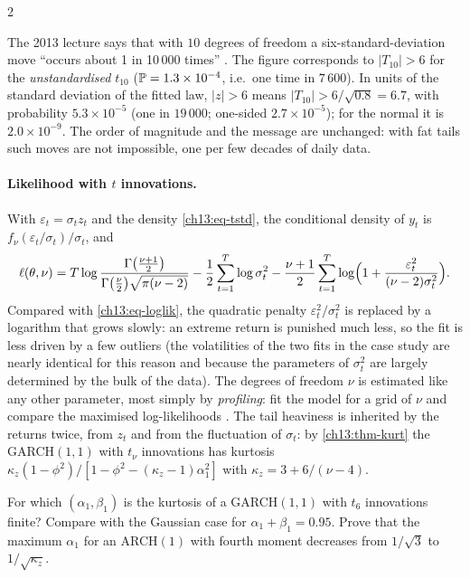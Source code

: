 \begin{paracol}{2}
\begin{coursenote}\label{ch13:cn-6sd}
The 2013 lecture says that with $10$ degrees of freedom a six-standard-deviation move ``occurs about 1 in 10\,000 times'' . The figure corresponds to $|T_{10}|>6$ for the \emph{unstandardised} $t_{10}$ ($\mathbb{P}=1.3\times10^{-4}$, i.e.\ one
time in $7\,600$). In units of the standard deviation of the fitted law, $|z|>6$ means $|T_{10}|>6/\sqrt{0.8}=6.7$, with probability $5.3\times10^{-5}$ (one in $19\,000$; one-sided $2.7\times10^{-5}$); for the normal it is $2.0\times10^{-9}$. The order of magnitude and the message are unchanged: with fat tails such moves are not
impossible, one per few decades of daily data.
\end{coursenote}

\paragraph{Likelihood with $t$ innovations.} With $\varepsilon_t=\sigma_tz_t$ and the density \eqref{ch13:eq-tstd}, the conditional density of $y_t$ is $f_\nu(\varepsilon_t/\sigma_t)/\sigma_t$, and
\begin{equation}\label{ch13:eq-loglikt}
  \ell(\theta,\nu)=T\log\frac{\Gamma\bigl(\frac{\nu+1}2\bigr)}{\Gamma\bigl(\frac\nu2\bigr)\sqrt{\pi(\nu-2)}}-\frac12\sum_{t=1}^T\log\sigma_t^2-\frac{\nu+1}2\sum_{t=1}^T\log\Bigl(1+\frac{\varepsilon_t^2}{(\nu-2)\sigma_t^2}\Bigr).
\end{equation}
Compared with \eqref{ch13:eq-loglik}, the quadratic penalty $\varepsilon_t^2/\sigma_t^2$ is replaced by a logarithm that grows slowly: an extreme return is punished much less, so the fit is less driven by a few outliers (the
volatilities of the two fits in the case study are nearly identical for this reason and because the parameters of $\sigma_t^2$ are largely determined by the bulk of the data). The degrees of freedom $\nu$ is estimated like any other parameter, most simply by \emph{profiling}: fit the model for a grid of $\nu$ and
compare the maximised log-likelihoods . The tail heaviness is inherited by the returns twice, from $z_t$ and from the fluctuation of $\sigma_t$: by \cref{ch13:thm-kurt} the GARCH$(1,1)$ with $t_\nu$ innovations has kurtosis
$\kappa_z(1-\phi^2)/[1-\phi^2-(\kappa_z-1)\alpha_1^2]$ with $\kappa_z=3+6/(\nu-4)$.

\begin{exercise}\label{ch13:ex-extra3}
For which $(\alpha_1,\beta_1)$ is the kurtosis of a GARCH$(1,1)$ with $t_6$ innovations finite? Compare with the Gaussian case for $\alpha_1+\beta_1=0.95$. Prove that the maximum $\alpha_1$ for an ARCH$(1)$ with fourth moment decreases from $1/\sqrt3$ to $1/\sqrt{\kappa_z}$.
\end{exercise}


\end{paracol}
